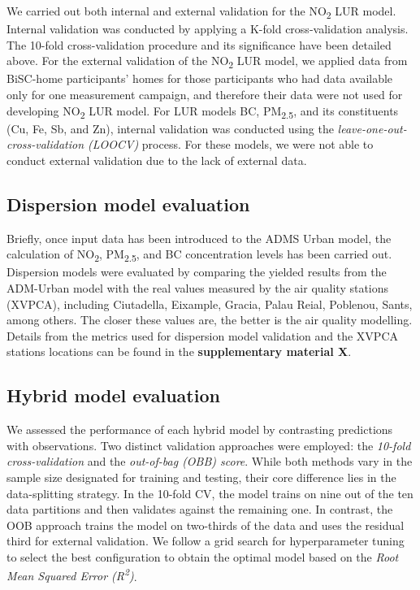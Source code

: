 \documentclass{article}
\begin{document}
We carried out both internal and external validation for the NO\textsubscript{2} LUR model. Internal validation was conducted by applying a K-fold cross-validation analysis. The 10-fold cross-validation procedure and its significance have been detailed above. For the external validation of the NO\textsubscript{2} LUR model, we applied data from BiSC-home participants' homes for those participants who had data available only for one measurement campaign, and therefore their data were not used for developing NO\textsubscript{2} LUR model. For LUR models BC, PM\textsubscript{2.5}, and its constituents (Cu, Fe, Sb, and Zn), internal validation was conducted using the \textit{leave-one-out-cross-validation (LOOCV)} process. For these models, we were not able to conduct external validation due to the lack of external data.

\subsection{Dispersion model evaluation}
 Briefly, once input data has been introduced to the ADMS Urban model, the calculation of NO\textsubscript{2}, PM\textsubscript{2.5}, and BC concentration levels has been carried out. Dispersion models were evaluated by comparing the yielded results from the ADM-Urban model with the real values measured by the air quality stations (XVPCA), including Ciutadella, Eixample, Gracia, Palau Reial, Poblenou, Sants, among others. The closer these values are, the better is the air quality modelling.  Details from the metrics used for dispersion model validation and the XVPCA stations locations can be found in the \textbf{supplementary material X}.\vspace{0.5cm}

\subsection{Hybrid model evaluation}
We assessed the performance of each hybrid model by contrasting predictions with observations. Two distinct validation approaches were employed: the \textit{10-fold cross-validation} and the \textit{out-of-bag (OBB) score}. While both methods vary in the sample size designated for training and testing, their core difference lies in the data-splitting strategy. In the 10-fold CV, the model trains on nine out of the ten data partitions and then validates against the remaining one. In contrast, the OOB approach trains the model on two-thirds of the data and uses the residual third for external validation. We follow a grid search for hyperparameter tuning  to select the best configuration to obtain the optimal model based on the \textit{Root Mean Squared Error (R\textsuperscript{2})}. 
\end{document}

